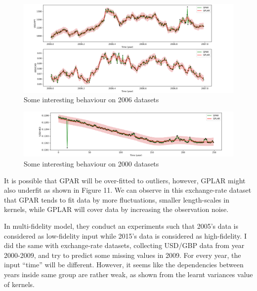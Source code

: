 \documentclass{article}
\begin{document}
\begin{figure}[H]
\centering
\includegraphics[width=.8\linewidth]{exchange-bi-2006.png}
\caption{Some interesting behaviour on 2006 datasets}
\end{figure}

\begin{figure}[H]
\centering
\includegraphics[width=.8\linewidth]{exchange-2000.png}
\caption{Some interesting behaviour on 2000 datasets}
\end{figure}

It is possible that GPAR will be over-fitted to outliers, however, GPLAR might also underfit as shown in Figure 11. We can observe in this exchange-rate dataset that GPAR tends to fit data by more fluctuations, smaller length-scales in kernels, while GPLAR will cover data by increasing the observation noise. 

\newpage
In multi-fidelity model, they conduct an experiments such that 2005's data is considered as low-fidelity input while 2015's data is considered as high-fidelity. I did the same with exchange-rate datasets, collecting USD/GBP data from year 2000-2009, and try to predict some missing values in 2009. For every year, the input ``time'' will be different. However, it seems like the dependencies between years inside same group are rather weak, as shown from the learnt variances value of kernels.
\end{document}
